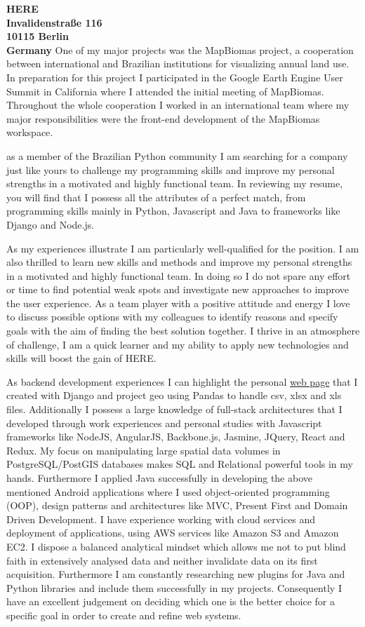 \documentclass[a4paper]{joaosoares-letter}
\begin{document}
\begin{letter}{\bfseries HERE\\Invalidenstraße 116\\10115 Berlin\\Germany}
One of my major projects was the MapBiomas project, a cooperation between international and Brazilian institutions for visualizing annual land use. In preparation for this project I participated in the Google Earth Engine User Summit in California where I attended the initial meeting of MapBiomas. Throughout the whole cooperation I worked in an international team where my major responsibilities were the front-end development of the MapBiomas workspace.

as a member of the Brazilian Python community I am searching for a company just like yours to challenge my programming skills and improve my personal strengths in a motivated and highly functional team. In reviewing my resume, you will find that I possess all the attributes of a perfect match, from programming skills mainly in Python, Javascript and Java to frameworks like Django and Node.js.


As my experiences illustrate I am particularly well-qualified for the position. I am also thrilled to learn new skills and methods and improve my personal strengths in a motivated and highly functional team. In doing so I do not spare any effort or time to find potential weak spots and investigate new approaches to improve the user experience. As a team player with a positive attitude and energy I love to discuss possible options with my colleagues to identify reasons and specify goals with the aim of finding the best solution together. I thrive in an atmosphere of challenge, I am a quick learner and my ability to apply new technologies and skills will boost the gain of HERE.

As backend development experiences I can highlight the personal \href{https://goo.gl/wrN029}{web page} that I created with Django and project geo using Pandas to handle csv, xlsx and xls files. Additionally I possess a large knowledge of full-stack architectures that I developed through work experiences and personal studies with Javascript frameworks like NodeJS, AngularJS, Backbone.js, Jasmine, JQuery, React and Redux. My focus on manipulating large spatial data volumes in PostgreSQL/PostGIS databases makes SQL and Relational powerful tools in my hands. Furthermore I applied Java successfully in developing the above mentioned Android applications where I used object-oriented programming (OOP), design patterns and architectures like MVC, Present First and Domain Driven Development. I have experience working with cloud services and deployment of applications, using AWS services like Amazon S3 and Amazon EC2. I dispose a balanced analytical mindset which allows me not to put blind faith in extensively analysed data and neither invalidate data on its first acquisition. Furthermore I am constantly researching new plugins for Java and Python libraries and include them successfully in my projects. Consequently I have an excellent judgement on deciding which one is the better choice for a specific goal in order to create and refine web systems.


\end{letter}
\end{document}
